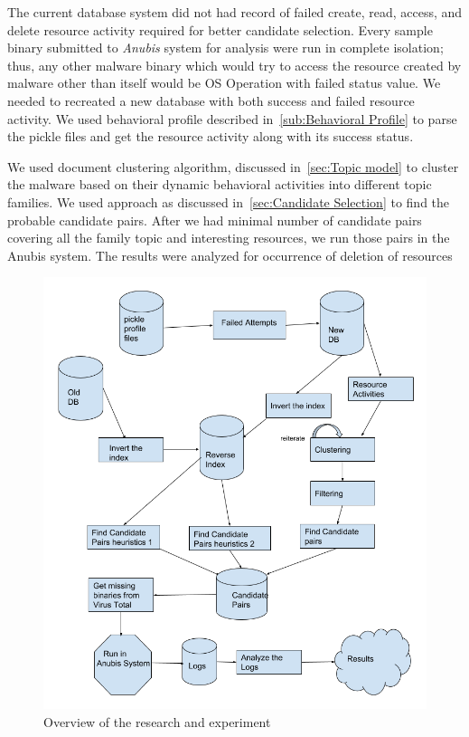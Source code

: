 The current database system did not had record of failed create, read, access, and delete resource activity required for better candidate selection.
Every sample binary submitted to \emph{Anubis} system for analysis were run in complete isolation; thus, any other malware binary which would try to access the resource created by malware other than itself would be OS Operation with failed status value.
We needed to recreated a new database with both success and failed resource activity.
We used behavioral profile described in~\ref{sub:Behavioral Profile} to parse the pickle files and get the resource activity along with its success status.

We used document clustering algorithm, discussed in~\autoref{sec:Topic model} to cluster the malware based on their dynamic behavioral activities into different topic families.
We used approach as discussed in~\autoref{sec:Candidate Selection} to find the probable candidate pairs.
After we had minimal number of candidate pairs covering all the family topic and interesting resources, we run those pairs in the Anubis system.
The results were analyzed for occurrence of deletion of resources
\begin{figure}[htbp]
  \centering
  \includegraphics[scale=0.5]{figures/bigpicture.png}
  \caption[Big Picture]{Overview of the research and experiment}\label{fig:bigpicture}
\end{figure}
